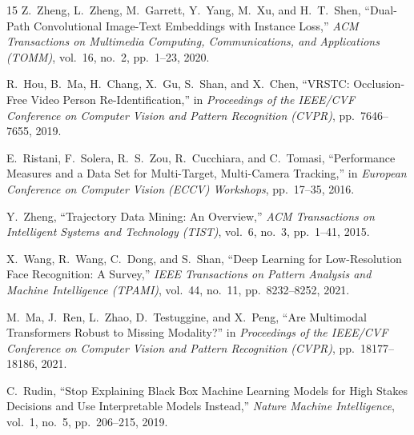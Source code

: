 \documentclass[conference]{IEEEtran}
\begin{document}
\begin{thebibliography}{15}
Z.~Zheng, L.~Zheng, M.~Garrett, Y.~Yang, M.~Xu, and H.~T.~Shen,
``Dual-Path Convolutional Image-Text Embeddings with Instance Loss,''
\emph{ACM Transactions on Multimedia Computing, Communications, and Applications (TOMM)}, vol.~16, no.~2, pp.~1--23, 2020.

R.~Hou, B.~Ma, H.~Chang, X.~Gu, S.~Shan, and X.~Chen,
``VRSTC: Occlusion-Free Video Person Re-Identification,''
in \emph{Proceedings of the IEEE/CVF Conference on Computer Vision and Pattern Recognition (CVPR)}, pp.~7646--7655, 2019.

E.~Ristani, F.~Solera, R.~S.~Zou, R.~Cucchiara, and C.~Tomasi,
``Performance Measures and a Data Set for Multi-Target, Multi-Camera Tracking,''
in \emph{European Conference on Computer Vision (ECCV) Workshops}, pp.~17--35, 2016.

Y.~Zheng,
``Trajectory Data Mining: An Overview,''
\emph{ACM Transactions on Intelligent Systems and Technology (TIST)}, vol.~6, no.~3, pp.~1--41, 2015.

X.~Wang, R.~Wang, C.~Dong, and S.~Shan,
``Deep Learning for Low-Resolution Face Recognition: A Survey,''
\emph{IEEE Transactions on Pattern Analysis and Machine Intelligence (TPAMI)}, vol.~44, no.~11, pp.~8232--8252, 2021.

M.~Ma, J.~Ren, L.~Zhao, D.~Testuggine, and X.~Peng,
``Are Multimodal Transformers Robust to Missing Modality?''
in \emph{Proceedings of the IEEE/CVF Conference on Computer Vision and Pattern Recognition (CVPR)}, pp.~18177--18186, 2021.

C.~Rudin,
``Stop Explaining Black Box Machine Learning Models for High Stakes Decisions and Use Interpretable Models Instead,''
\emph{Nature Machine Intelligence}, vol.~1, no.~5, pp.~206--215, 2019.

\end{thebibliography}
\end{document}
